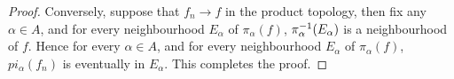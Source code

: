 \documentclass[../../main.tex]{subfiles}
\begin{document}
\begin{proof}
    Conversely, suppose that $f_n\to f$ in the product topology, then fix any $\alpha\in A$, and for every neighbourhood $E_\alpha$ of $\pi_\alpha(f)$, $\pi_{\alpha}^{-1}({E_\alpha})$ is a neighbourhood of $f$. Hence for every $\alpha\in A$, and for every neighbourhood $E_\alpha$ of $\pi_\alpha(f)$, $pi_\alpha(f_n)$ is eventually in $E_\alpha$. This completes the proof.
\end{proof}
\end{document}
